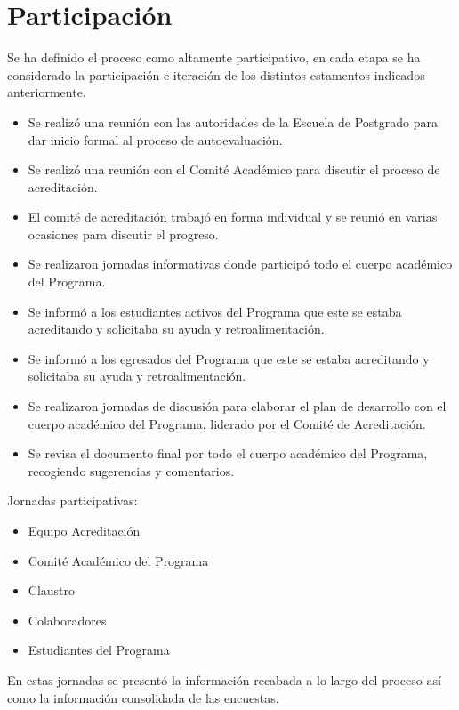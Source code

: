 
\section{Participación}

Se ha definido el proceso como altamente participativo, en cada etapa se ha considerado la
participación e iteración de los distintos estamentos indicados anteriormente.

\begin{itemize}
\item Se realizó una reunión con las autoridades de la Escuela de Postgrado para dar inicio formal al proceso de autoevaluación.
\item Se realizó una reunión con el Comité Académico para discutir el proceso de acreditación.
\item El comité de acreditación trabajó en forma individual y se reunió en varias ocasiones para discutir el progreso.
\item Se realizaron jornadas informativas donde participó todo el cuerpo académico del Programa.
\item Se informó a los estudiantes activos del Programa que este se estaba acreditando y solicitaba su ayuda y retroalimentación.
\item Se informó a los egresados del Programa que este se estaba acreditando y solicitaba su ayuda y retroalimentación.
\item Se realizaron jornadas de discusión para elaborar el plan de desarrollo con el cuerpo académico del Programa, liderado por el Comité de Acreditación.
\item Se revisa el documento final por todo el cuerpo académico del Programa, recogiendo sugerencias y comentarios.
\end{itemize}


Jornadas participativas:

\begin{itemize}
\item Equipo Acreditación
\item Comité Académico del Programa
\item Claustro
\item Colaboradores
\item Estudiantes del Programa
\end{itemize}

En estas jornadas se presentó la información recabada a lo largo del proceso así como la información consolidada de las encuestas.


